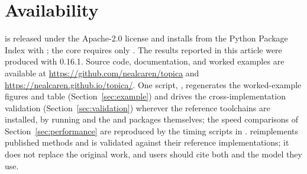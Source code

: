 \documentclass[article,nojss]{jss}
\begin{document}
\section{Availability}\label{sec:availability}

 is released under the Apache-2.0 license and installs from the
Python Package Index with ; the core requires only
. The results reported in this article were produced with
 0.16.1. Source code, documentation, and worked examples are available at
\url{https://github.com/nealcaren/topica} and
\url{https://nealcaren.github.io/topica/}. One script, ,
regenerates the worked-example figures and table (Section~\ref{sec:example}) and
drives the cross-implementation validation (Section~\ref{sec:validation}) wherever
the reference toolchains are installed, by running  and the
  and  packages themselves; the speed comparisons
of Section~\ref{sec:performance} are reproduced by the timing scripts in
.  reimplements published
methods and is validated against their reference implementations; it does not
replace the original work, and users should cite both 
\citep{caren2026topica} and the model they use.


\end{document}
